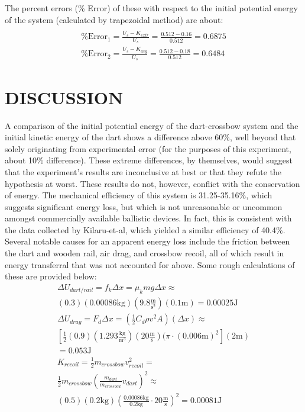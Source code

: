 \documentclass[twocolumn, 10pt]{article}
\begin{document}
The percent errors (\% Error) of these with respect to the initial potential energy of the system (calculated by trapezoidal method) are about:
\vspace{-5pt}
\begin{gather*}
	\\ \text{\% Error}_1 = \frac{U_s-K_{extr}}{U_s} = \frac{0.512-0.16}{0.512} = 0.6875
	\\ \text{\% Error}_2 = \frac{U_s-K_{avg}}{U_s} = \frac{0.512-0.18}{0.512} = 0.6484
\end{gather*}

\section*{DISCUSSION}
A comparison of the initial potential energy of the dart-crossbow system and the initial kinetic energy of the dart shows a difference above 60\%, well beyond that solely originating from experimental error (for the purposes of this experiment, about 10\% difference).  These extreme differences, by themselves, would suggest that the experiment’s results are inconclusive at best or that they refute the hypothesis at worst. These results do not, however, conflict with the conservation of energy. The mechanical efficiency of this system is 31.25-35.16\%, which suggests significant energy loss, but which is not unreasonable or uncommon amongst commercially available ballistic devices. In fact, this is consistent with the data collected by Kilaru-et-al, which yielded a similar efficiency of 40.4\%. Several notable causes for an apparent energy loss include the friction between the dart and wooden rail, air drag, and crossbow recoil, all of which result in energy transferral that was not accounted for above. Some rough calculations of these are provided below:
\vspace{-5pt}
\begin{align*}
    \Delta U_{dart/rail} = f_k\Delta x = \mu_kmg\Delta x \approx \\
    (0.3)(0.00086\text{kg})(9.8\frac{\text{m}}{\text{s}^2}) (0.1\text{m}) = 0.00025 \text{J} \\
    \Delta U_{drag} = F_d\Delta x = (\frac{1}{2}C_d\rho v^2 A)(\Delta x) \approx \\
    [\frac{1}{2}(0.9)(1.293\frac{\text{kg}}{\text{m}^3})(20\frac{\text{m}}{\text{s}})(\pi\cdot (0.006\text{m})^2](2\text{m}) \\
    = 0.053 \text{J} \\
    K_{recoil}=\frac{1}{2}m_{crossbow}v_{recoil}^2 = \\
    \frac{1}{2}m_{crossbow}(\frac{m_{dart}}{m_{crossbow}}v_{dart})^2\approx \\
    (0.5)(0.2\text{kg})(\frac{0.00086\text{kg}}{0.2\text{kg}} \cdot 20\frac{\text{m}}{\text{s}})^2 = 0.00081 \text{J}
\end{align*}
\end{document}

